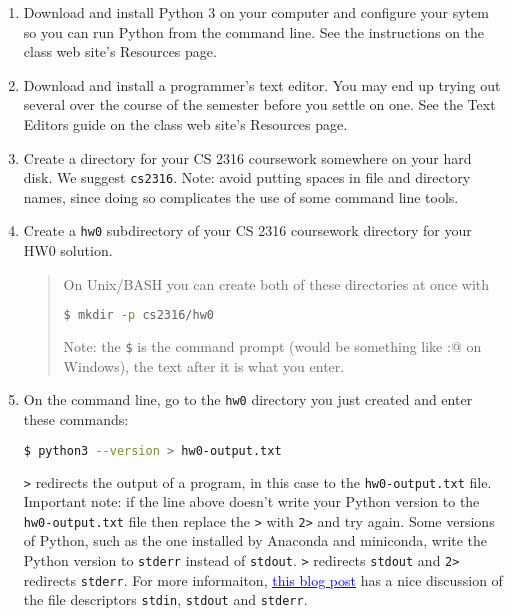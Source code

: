 \documentclass[12pt]{article}
\newcommand{\link}[2]{\href{#1}{\textcolor{blue}{\underline{#2}}}}
\begin{document}
\begin{enumerate}
\itemsep0em
\item Download and install Python 3 on your computer and configure your sytem so you can run Python from the command line. See the instructions on the class web site's Resources page.
\item Download and install a programmer's text editor.  You may end up trying out several over the course of the semester before you settle on one. See the Text Editors guide on the class web site's Resources page.
\item Create a directory for your CS 2316 coursework somewhere on your hard disk.  We suggest {\tt cs2316}.  Note: avoid putting spaces in file and directory names, since doing so complicates the use of some command line tools.
\item Create a {\tt hw0} subdirectory of your CS 2316 coursework directory for your HW0 solution.
\begin{quote}
On Unix/BASH you can create both of these directories at once with
\begin{lstlisting}[language=bash]
$ mkdir -p cs2316/hw0
\end{lstlisting}
Note: the {\tt \$} is the command prompt (would be something like \verb@C:\>@ on Windows), the text after it is what you enter.
\end{quote}
\item On the command line, go to the {\tt hw0} directory you just created and enter these commands:
\begin{lstlisting}[language=bash]
$ python3 --version > hw0-output.txt
\end{lstlisting}
{\tt >} redirects the output of a program, in this case to the {\tt hw0-output.txt} file. Important note: if the line above doesn't write your Python version to the {\tt hw0-output.txt} file then replace the {\tt >} with {\tt 2>} and try again. Some versions of Python, such as the one installed by Anaconda and miniconda, write the Python version to {\tt stderr} instead of {\tt stdout}. {\tt >} redirects {\tt stdout} and {\tt 2>} redirects {\tt stderr}. For more informaiton,  \link{http://www.jstorimer.com/blogs/workingwithcode/7766119-when-to-use-stderr-instead-of-stdout}{this blog post} has a nice discussion of the file descriptors {\tt stdin}, {\tt stdout} and {\tt stderr}.


\end{enumerate}
\end{document}
